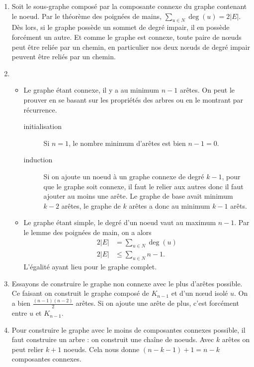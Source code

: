 \begin{solution}
  \begin{enumerate}
    \item Soit le sous-graphe composé par la composante connexe du graphe contenant le noeud.
      Par le théorème des poignées de mains, $\sum_{u \in N} \deg(u) = 2|E|$.
      Dès lors, si le graphe possède un sommet de degré impair, il en possède forcément un autre.
      Et comme le graphe est connexe, toute paire de nœuds peut être reliée par un chemin,
      en particulier nos deux nœuds de degré impair peuvent être reliés par un chemin.
    \item
      \begin{itemize}
        \item Le graphe étant connexe, il y a au minimum $n-1$ arêtes.
          On peut le prouver en se basant sur les propriétés des arbres ou en le montrant par récurrence.
          \begin{description}
            \item[initialisation] Si $n = 1$, le nombre minimum d'arêtes est bien $n - 1 = 0$.
            \item[induction] Si on ajoute un noeud à un graphe connexe de degré $k-1$,
              pour que le graphe soit connexe, il faut
              le relier aux autres donc il faut ajouter au moins une arête.
              Le graphe de base avait minimum $k-2$ arêtes,
              le graphe de $k$ arêtes a donc au minimum $k-1$ arêts.
          \end{description}
        \item Le graphe étant simple, le degré d'un noeud vaut au maximum $n-1$.
          Par le lemme des poignées de main, on a alors
          \begin{align*}
            2|E| & = \sum_{u \in N} \deg(u)\\
            2|E| & \leq \sum_{u \in N} n-1.
          \end{align*}
          L'égalité ayant lieu pour le graphe complet.
      \end{itemize}
    \item Essayons de construire le graphe non connexe avec le plus d'arêtes possible.
      Ce faisant on construit le graphe composé de $K_{n-1}$ et d'un nœud isolé $u$.
      On a bien $\frac{(n-1)(n-2)}{2}$ arêtes.
      Si on ajoute une arête de plus, c'est forcément entre $u$ et $K_{n-1}$.
    \item Pour construire le graphe avec le moins de composantes connexes possible, il faut construire un arbre : on construit une chaîne de noeuds. Avec $k$ arêtes on peut relier $k+1$ noeuds. Cela nous donne $(n-k-1)+1=n-k$ composantes connexes.
  \end{enumerate}
\end{solution}

